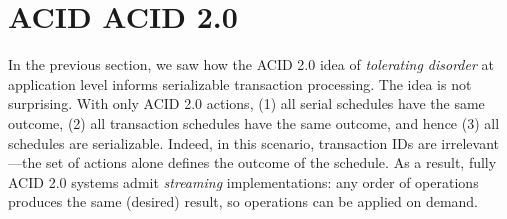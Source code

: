 \documentclass{sig-alternate}
\newcommand{\jmh}[1]{{\textcolor{red}{#1 -- jmh}}}
\begin{document}
\begin{comment}
As an example, consider the classic case of debit/credit ledgers.  We begin with
the simple case in which all actions are credits. We assume that an account is
liquid if its balance is above zero. In Bloom's lattice notation~\cite{Conway2012},
this looks like so:
\begin{quote}
  \jmh{`ledger' is an lmap with key `acctId' and value an lset of [xid, amount]
    pairs.  `balance' is a derived lmap with key `acctId' and an lmax `value'.
    `liquid' is an lmap from `acctId' to an lbool `status'.  The monotone
    function sum maps from [xid,amount] to `value', and the monotone function gt
    maps from `value' to `status'. Need to give syntax and explanation, perhaps
    in a figure if its too big a gulp inline.  I fudged: ledger is not a
    sequence, it's a set.  That's OK for the credit-only scenario, but kinda
    bogus.}
\end{quote}
In a credit-only scenario, the ledger grows monotonically as a set of credits,
the account balances grow monotonically as integers, and account liquidity grows
monotonically as a boolean (from false to true).  However, consider introducing
debits that succeed only if the account would remain liquid: ``conflicts'' can
arise between the liquidity checks of debits and credits, so we must establish
ordering constraints for each debit with respect to preceding credits.  However,
the order among credits remains irrelevant---the only order that matters relates
to the non-monotone operator `debit'.  In Bloom, this non-monotonicity is again
clear from the syntax and checkable by a parser:
\begin{quote}
	\jmh{debit logic including threshold test goes here}
\end{quote}
Note that we can be finer-grained in our assessment of conflict: there are no
conflicts across acctIds, which can be determined via analyzing the program
logic: the grouping of balance by acctID \emph{partitions} the ledger.  This
partitioning is akin to the partitioning of Reads and Writes, which conflict
only if they are on the same object.
\end{comment}

\section{ACID ACID 2.0}
In the previous section, we saw how the ACID 2.0 idea of \emph{tolerating
  disorder} at application level informs serializable transaction
processing. The idea is not surprising.  With only ACID 2.0 actions, (1) all
serial schedules have the same outcome, (2) all transaction schedules have the
same outcome, and hence (3) all schedules are serializable.  Indeed, in this
scenario, transaction IDs are irrelevant---the set of actions alone defines the
outcome of the schedule.  As a result, fully ACID 2.0 systems admit
\emph{streaming} implementations: any order of operations produces the same
(desired) result, so operations can be applied on demand.
\end{document}
